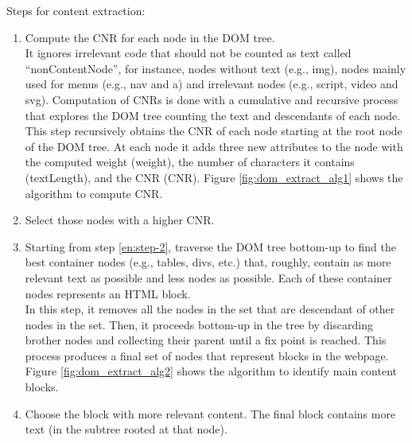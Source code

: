 \documentclass[letterpaper,11pt]{article}
\begin{document}
Steps for content extraction:
\begin{enumerate}
	\item Compute the CNR for each node in the DOM tree.\\
	 It ignores irrelevant code that should not be counted as text called “nonContentNode”, for instance, nodes without text (e.g., img), nodes mainly used for menus (e.g., nav and a) and irrelevant nodes (e.g., script, video and svg). Computation of CNRs is done with a cumulative and recursive process that explores the DOM tree counting the text and descendants of each node. This step recursively obtains the CNR of each node starting at the root node of the DOM tree. At each node it adds three new attributes to the node with the computed weight (weight), the number of characters it contains (textLength), and the CNR (CNR). Figure \ref{fig:dom_extract_alg1} shows the algorithm to compute CNR. 
	\item \label{en:step-2} Select those nodes with a higher CNR.
	\item Starting from step \ref{en:step-2}, traverse the DOM tree bottom-up to find the best container nodes (e.g., tables, divs, etc.) that, roughly, contain as more relevant text as possible and less nodes as possible. Each of these container nodes represents an HTML block.\\
	In this step, it removes all the nodes in the set that are descendant of other nodes in the set. Then, it proceeds bottom-up in the tree by discarding brother nodes and collecting their parent until a fix point is reached. This process produces a final set of nodes that represent blocks in the webpage. Figure \ref{fig:dom_extract_alg2} shows the algorithm to identify main content blocks. 
	\item Choose the block with more relevant content. The final block contains more text (in the subtree rooted at that node).
\end{enumerate}
\end{document}
